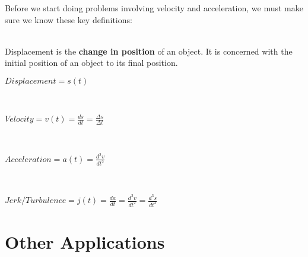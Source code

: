\documentclass[12pt,fleqn]{book} %
\begin{document}
Before we start doing problems involving velocity and acceleration, we must make sure we know these key definitions:

\vspace*{2mm}

 \\
Displacement is the \textbf{change in position} of an object. It is concerned with the initial position of an object to its final position.

\begin{center}
    {\large $Displacement = s(t)$}

\end{center}

\vspace*{3mm}

 \\

\begin{center}
    {\large $Velocity = v(t) = \frac{ds}{dt} = \frac{\Delta s}{\Delta t}$}

\end{center}

\vspace*{3mm}

 \\

\begin{center}
    {\large $Acceleration = a(t) = \frac{d^2v}{dt^2}$}

\end{center}

\vspace*{3mm}

 \\

\begin{center}
    {\large $Jerk/Turbulence = j(t) = \frac{da}{dt} = \frac{d^2v}{dt^2} = \frac{d^3s}{dt^3}$}
\end{center}


\vspace*{3mm}




\section{Other Applications}

\begin{center}

\end{center}

\vspace*{-3mm}

\pagebreak

\begin{center}

\end{center}
\end{document}
